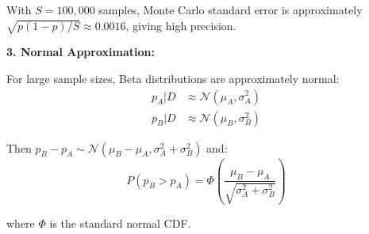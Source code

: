 With $S = 100,000$ samples, Monte Carlo standard error is approximately $\sqrt{p(1-p)/S} \approx 0.0016$, giving high precision.

\textbf{3. Normal Approximation:}

For large sample sizes, Beta distributions are approximately normal:
\begin{align}
p_A | D &\approx \mathcal{N}(\mu_A, \sigma_A^2) \\
p_B | D &\approx \mathcal{N}(\mu_B, \sigma_B^2)
\end{align}

Then $p_B - p_A \sim \mathcal{N}(\mu_B - \mu_A, \sigma_A^2 + \sigma_B^2)$ and:
\begin{equation}
P(p_B > p_A) = \Phi\left(\frac{\mu_B - \mu_A}{\sqrt{\sigma_A^2 + \sigma_B^2}}\right)
\end{equation}

where $\Phi$ is the standard normal CDF.


